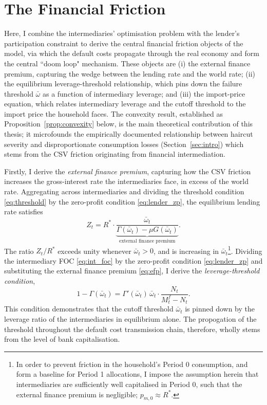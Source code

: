 \documentclass[11pt]{article}
\theoremstyle{definition}
\theoremstyle{plain}
\theoremstyle{remark}
\newcommand{\Mf}{M^{f}}
\newcommand{\Rstar}{R^{*}}
\begin{document}
\section{The Financial Friction} \label{sec:optimality}

Here, I combine the intermediaries' optimisation problem with the lender's participation constraint to derive the central financial friction objects of the model, via which the default costs propagate through the real economy and form the central ``doom loop" mechanism. These objects are (i) the external finance premium, capturing the wedge between the lending rate and the world rate; (ii) the equilibrium leverage-threshold relationship, which pins down the failure threshold $\bar\omega$ as a function of intermediary leverage; and (iii) the import-price equation, which relates intermediary leverage and the cutoff threshold to the import price the household faces. The convexity result, established as Proposition~\ref{prop:convexity} below, is the main theoretical contribution of this thesis; it microfounds the empirically documented relationship between haircut severity and disproportionate consumption losses (Section~\ref{sec:intro}) which stems from the CSV friction originating from financial intermediation.

Firstly, I derive the \textit{external finance premium}, capturing how the CSV friction increases the gross-interest rate the intermediaries face, in excess of the world rate. Aggregating across intermediaries and dividing the threshold condition \eqref{eq:threshold} by the zero-profit condition \eqref{eq:lender_zp}, the equilibrium lending rate satisfies
\begin{equation}\label{eq:efp}
Z_t = \Rstar \cdot \underbrace{\frac{\bar{\omega}_t}{\Gamma(\bar{\omega}_t) - \mu G(\bar{\omega}_t)}}_{\text{external finance premium}}.
\end{equation}
The ratio $Z_t / \Rstar$ exceeds unity whenever $\bar{\omega}_t > 0$, and is increasing in $\bar{\omega}_t$\footnote{In order to prevent friction in the household's Period 0 consumption, and form a baseline for Period 1 allocations, I impose the assumption herein that intermediaries are sufficiently well capitalised in Period 0, such that the external finance premium is negligible; $p_{m,0} \approx  \Rstar$.}. Dividing the intermediary FOC \eqref{eq:int_foc} by the zero-profit condition \eqref{eq:lender_zp} and substituting the external finance premium \eqref{eq:efp}, I derive the \textit{leverage-threshold condition},
\begin{equation}\label{eq:omega_leverage}
1 - \Gamma(\bar{\omega}_t) = \Gamma'(\bar{\omega}_t)\,\bar{\omega}_t \cdot \frac{N_t}{ \Mf_t - N_t}.
\end{equation}
This condition demonstrates that the cutoff threshold $\bar{\omega}_t$ is pinned down by the leverage ratio of the intermediaries in equilibrium alone. The propogation of the threshold throughout the default cost transmission chain, therefore, wholly stems from the level of bank capitalisation.
\end{document}
